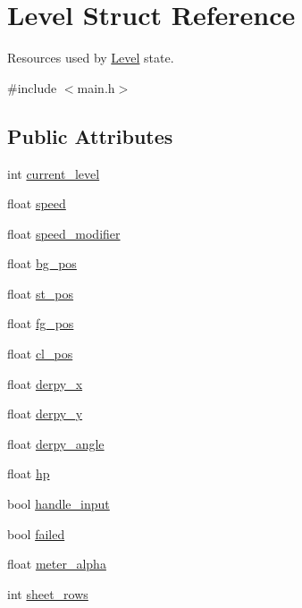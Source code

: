 \hypertarget{structLevel}{\section{Level Struct Reference}
\label{structLevel}
}


Resources used by \hyperlink{structLevel}{Level} state.  




{\ttfamily \#include $<$main.\-h$>$}

\subsection*{Public Attributes}
\begin{DoxyCompactItemize}
\item 
int \hyperlink{structLevel_a1ba3ee0104c912dde5d6e70fee889512}{current\-\_\-level}
\item 
float \hyperlink{structLevel_a936a1d131d1e056878474ca831c5e88f}{speed}
\item 
float \hyperlink{structLevel_a0f6fa70a2e0b85437dc1973d1409381f}{speed\-\_\-modifier}
\item 
float \hyperlink{structLevel_a00321214fdc30f67615053d1ca614948}{bg\-\_\-pos}
\item 
float \hyperlink{structLevel_ab13f799d9e2e06a04debbd97676fb512}{st\-\_\-pos}
\item 
float \hyperlink{structLevel_a665bb93951ab6b7a91543712152a3acf}{fg\-\_\-pos}
\item 
float \hyperlink{structLevel_af466533be369b5ce1f48196a7f3b7b0b}{cl\-\_\-pos}
\item 
float \hyperlink{structLevel_ae5a97d5b61c70c63e93992a9ff3935f9}{derpy\-\_\-x}
\item 
float \hyperlink{structLevel_a7b3c0f5af134797a1ed21ef48da3ab00}{derpy\-\_\-y}
\item 
float \hyperlink{structLevel_a364d35d138549a87532d959288283956}{derpy\-\_\-angle}
\item 
float \hyperlink{structLevel_a49df009e8113251cfcb48fe17df0b571}{hp}
\item 
bool \hyperlink{structLevel_a06cf4f2da517284d2006540051d3e5c0}{handle\-\_\-input}
\item 
bool \hyperlink{structLevel_a5bea34b31777260f1b23a1d64e6cd865}{failed}
\item 
float \hyperlink{structLevel_a246ce1ecf1523db218cf067df15e511f}{meter\-\_\-alpha}
\item 
int \hyperlink{structLevel_a6d608b79c9b4dd8a5efc0c7e5fb482b0}{sheet\-\_\-rows}

\end{DoxyCompactItemize}
